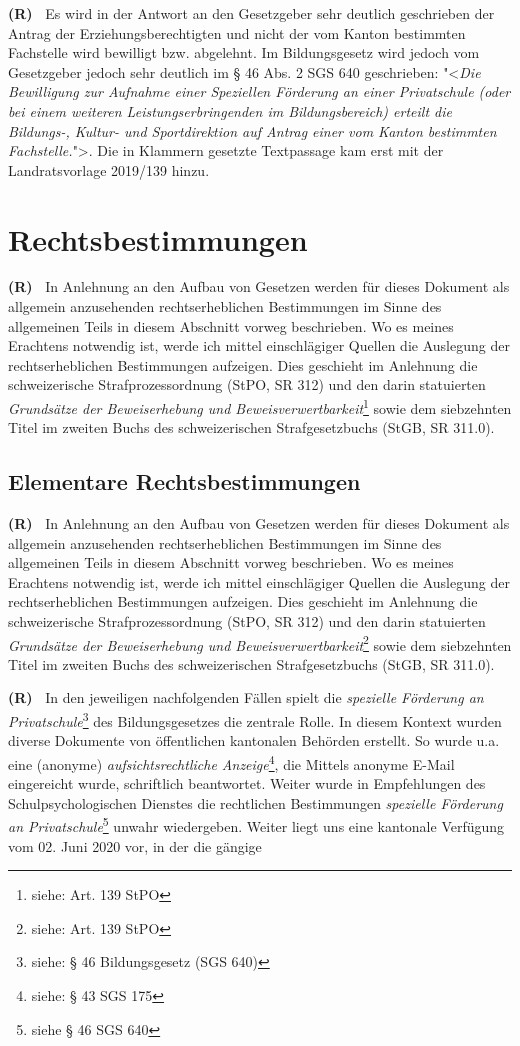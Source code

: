 \documentclass[paper=a4,fontsize=12pt, oneside, numbers=noenddot]{scrbook}
\newcounter{rz}
\newcommand{\Rz}{
	\addtocounter{rz}{1}\textbf{(R\arabic{rz})~}
}
\begin{document}
\Rz Es wird in der Antwort an den Gesetzgeber sehr deutlich geschrieben der Antrag der Erziehungsberechtigten und nicht der vom Kanton bestimmten Fachstelle wird bewilligt bzw. abgelehnt. Im Bildungsgesetz wird jedoch vom Gesetzgeber jedoch sehr deutlich im § 46 Abs. 2 SGS 640 geschrieben: "<\textit{Die Bewilligung zur Aufnahme einer Speziellen Förderung an einer Privatschule (oder bei einem weiteren Leistungserbringenden im Bildungsbereich) erteilt die Bildungs-, Kultur- und Sportdirektion auf Antrag einer vom Kanton bestimmten Fachstelle.}">. Die in Klammern gesetzte Textpassage kam erst mit der Landratsvorlage 2019/139 hinzu.


\chapter{Rechtsbestimmungen}
\Rz In Anlehnung an den Aufbau von Gesetzen werden für dieses Dokument als allgemein anzusehenden rechtserheblichen Bestimmungen im Sinne des allgemeinen Teils in diesem Abschnitt vorweg beschrieben. Wo es meines Erachtens notwendig ist, werde ich mittel einschlägiger Quellen die Auslegung der rechtserheblichen Bestimmungen aufzeigen. Dies geschieht im Anlehnung die schweizerische Strafprozessordnung (StPO, SR 312) und den darin statuierten \textit{Grundsätze der Beweiserhebung und Beweisverwertbarkeit}\footnote{siehe: Art. 139 StPO} sowie dem siebzehnten Titel im zweiten Buchs des schweizerischen Strafgesetzbuchs (StGB, SR 311.0).


\section{Elementare Rechtsbestimmungen}
\Rz In Anlehnung an den Aufbau von Gesetzen werden für dieses Dokument als allgemein anzusehenden rechtserheblichen Bestimmungen im Sinne des allgemeinen Teils in diesem Abschnitt vorweg beschrieben. Wo es meines Erachtens notwendig ist, werde ich mittel einschlägiger Quellen die Auslegung der rechtserheblichen Bestimmungen aufzeigen. Dies geschieht im Anlehnung die schweizerische Strafprozessordnung (StPO, SR 312) und den darin statuierten \textit{Grundsätze der Beweiserhebung und Beweisverwertbarkeit}\footnote{siehe: Art. 139 StPO} sowie dem siebzehnten Titel im zweiten Buchs des schweizerischen Strafgesetzbuchs (StGB, SR 311.0).



\Rz In den jeweiligen nachfolgenden Fällen spielt die \textit{spezielle Förderung an Privatschule}\footnote{siehe: § 46 Bildungsgesetz (SGS 640)}  des Bildungsgesetzes die zentrale Rolle. In diesem Kontext wurden diverse Dokumente von öffentlichen kantonalen Behörden erstellt. So wurde u.a. eine (anonyme) \textit{aufsichtsrechtliche Anzeige}\footnote{siehe: § 43 SGS 175}, die Mittels anonyme E-Mail eingereicht wurde, schriftlich beantwortet. Weiter wurde in Empfehlungen des Schulpsychologischen Dienstes die rechtlichen Bestimmungen \textit{spezielle Förderung an Privatschule}\footnote{siehe § 46 SGS 640} unwahr wiedergeben. Weiter liegt uns eine kantonale Verfügung vom 02. Juni 2020 vor, in der die gängige 
\end{document}
